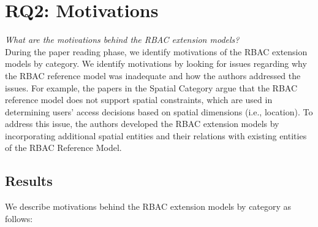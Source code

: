 \section{RQ2: Motivations} \label{sec:motivations}

\textit{What are the motivations behind the RBAC extension models?}
\\

During the paper reading phase, we identify motivations of the RBAC extension models by category. 
We identify motivations by looking for issues regarding why the RBAC reference model was inadequate and how the authors addressed the issues. 
For example, the papers in the Spatial Category argue that the RBAC reference model does not support spatial constraints, which are used in determining users' access decisions based on spatial dimensions (i.e., location). 
To address this issue, the authors developed the RBAC extension models by incorporating additional spatial entities and their relations with existing entities of the RBAC Reference Model. 


\subsection{Results}

We describe motivations behind the RBAC extension models by category as follows:

